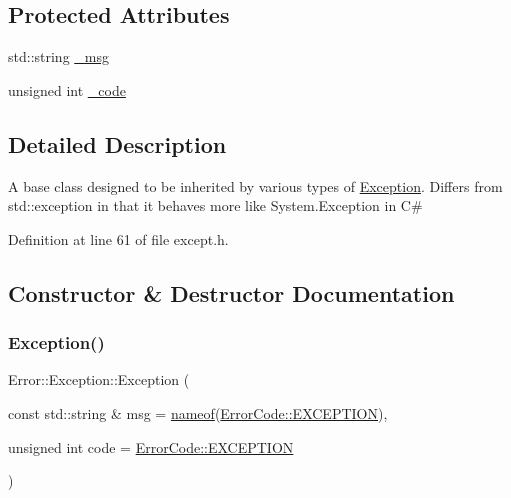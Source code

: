 \subsection*{Protected Attributes}
\begin{DoxyCompactItemize}
\item 
std\+::string \hyperlink{class_error_1_1_exception_a61695262013be27ae2053111c70f03a5}{\+\_\+msg}
\item 
unsigned int \hyperlink{class_error_1_1_exception_a3f15b05b9087dd84715995e7c94c7492}{\+\_\+code}
\end{DoxyCompactItemize}


\subsection{Detailed Description}
A base class designed to be inherited by various types of \hyperlink{class_error_1_1_exception}{Exception}. Differs from std\+::exception in that it behaves more like System.\+Exception in C\# 

Definition at line 61 of file except.\+h.



\subsection{Constructor \& Destructor Documentation}
\hypertarget{class_error_1_1_exception_a70a660fb0a4db6cf2292dec3a1fd498c}{}\label{class_error_1_1_exception_a70a660fb0a4db6cf2292dec3a1fd498c} 
\subsubsection{\texorpdfstring{Exception()}{Exception()}}
{\footnotesize\ttfamily Error\+::\+Exception\+::\+Exception (\begin{DoxyParamCaption}\item[{const std\+::string \&}]{msg = {\ttfamily \hyperlink{macros_8h_a235bdec0a6bf62f3b3af87e528109847}{nameof}(\hyperlink{namespace_error_1_1_error_code_ae85b7b550a5a82a4f04d8d5df167f081}{Error\+Code\+::\+E\+X\+C\+E\+P\+T\+I\+ON})},  }\item[{unsigned int}]{code = {\ttfamily \hyperlink{namespace_error_1_1_error_code_ae85b7b550a5a82a4f04d8d5df167f081}{Error\+Code\+::\+E\+X\+C\+E\+P\+T\+I\+ON}} }\end{DoxyParamCaption})}

